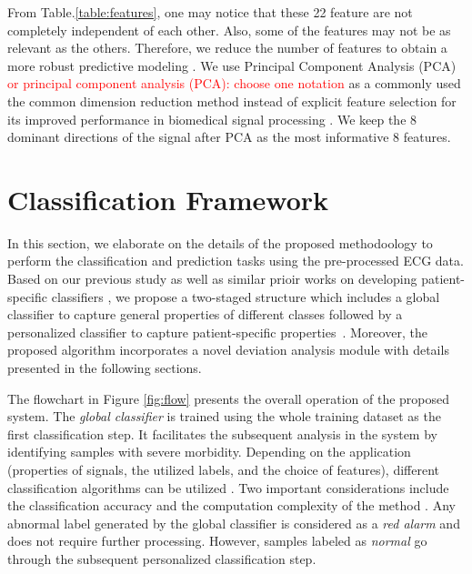 From Table.\ref{table:features}, one may notice that these 22 feature are not completely independent of each other. Also, some of the features may not be as relevant as the others. Therefore, we reduce the number of features to obtain a more robust predictive modeling \cite{Some references for feature selection}. We use Principal Component Analysis (PCA) \textcolor{red}{or principal component analysis (PCA): choose one notation} as a commonly used the common dimension reduction method instead of explicit feature selection for its improved performance in biomedical signal processing \cite{Some references for PCA as a dimension reduction method}. We keep the 8 dominant directions of the signal after PCA as the most informative 8 features.



\section{Classification Framework}

In this section, we elaborate on the details of the proposed methodoology to perform the classification and prediction tasks using the pre-processed ECG data. Based on our previous study \cite{chen2018predictive} as well as similar prioir works on developing patient-specific classifiers \cite{Hu_et_al,deChazal2006,llamedo2012automatic}, we propose a two-staged structure which includes a global classifier to capture general properties of different classes followed by a personalized classifier to capture patient-specific properties~\cite{chen2018predictive,Hu_et_al,deChazal2006,llamedo2012automatic}. Moreover, the proposed algorithm incorporates a novel deviation analysis module with details presented in the following sections. 


The flowchart in Figure \ref{fig:flow} presents the overall operation of the proposed system. The \textit{global classifier} is trained using the whole training dataset as the first classification step. It facilitates the subsequent analysis in the system by identifying samples with severe morbidity. Depending on the application (properties of signals, the utilized labels, and the choice of features), different classification algorithms can be utilized \cite{REF}. Two important considerations include the classification accuracy and the computation complexity of the method \cite{REF}. Any abnormal label generated by the global classifier is considered as a \textit{red alarm} and does not require further processing. However, samples labeled as  \textit{normal} go through the subsequent personalized classification step. 

